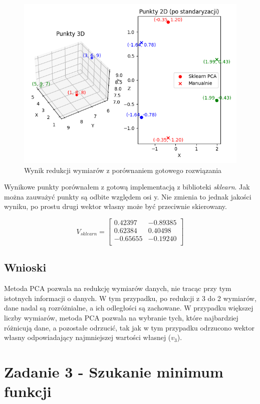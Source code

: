 \documentclass{article}
\begin{document}
\begin{figure}[H]
    \centering
    \includegraphics[width=0.8\linewidth]{Zad2/pca.png}
    \caption{Wynik redukcji wymiarów z porównaniem gotowego rozwiązania}
\end{figure}

Wynikowe punkty porównałem z gotową implementacją z biblioteki \textit{sklearn}.
Jak można zauważyć punkty są odbite względem osi y.
Nie zmienia to jednak jakości wyniku,
po prostu drugi wektor własny może być przeciwnie skierowany.

\begin{equation*}
    V_{sklearn} = 
    \begin{bmatrix}
        0.42397 & -0.89385 \\
        0.62384 & 0.40498 \\
        -0.65655 & -0.19240 \\
    \end{bmatrix}
\end{equation*}

\subsection{Wnioski}

Metoda PCA pozwala na redukcję wymiarów danych, nie tracąc przy tym
istotnych informacji o danych. W tym przypadku, po redukcji z 3 do 2 wymiarów,
dane nadal są rozróżnialne, a ich odległości są zachowane. W przypadku
większej liczby wymiarów, metoda PCA pozwala na wybranie tych, które
najbardziej różnicują dane, a pozostałe odrzucić, tak jak w tym 
przypadku odrzucono wektor własny odpowiadający najmniejszej wartości
własnej ($v_3$).

\section{Zadanie 3 - Szukanie minimum funkcji}
\end{document}
